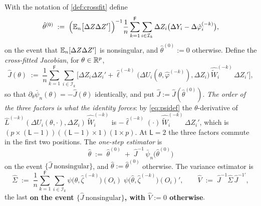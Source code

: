 \begin{definition}\label{def:onestep}
With the notation of \cref{def:crossfit} define
\begin{equation}\label{eq:prelimtheta}
\hat\theta^{(0)}\;:=\;\Big(\mathbb{E}_n\big[\Delta Z\Delta Z'\big]\Big)^{-1}
\frac1n\sum_{k=1}^{\mathsf F}\sum_{i\in\mathcal I_k}\Delta Z_i\big(\Delta Y_i-\Delta\hat\varphi^{(-k)}_i\big),
\end{equation}
on the event that $\mathbb{E}_n[\Delta Z\Delta Z']$ is nonsingular, and $\hat\theta^{(0)}:=0$ otherwise. Define
the \emph{cross-fitted Jacobian}, for $\theta\in\mathbb{R}^{p}$,
\begin{equation}\label{eq:Jhat}
\hat J(\theta)\;:=\;\frac1n\sum_{k=1}^{\mathsf F}\sum_{i\in\mathcal I_k}
\Big[\Delta Z_i\Delta Z_i'+
\hat\ell^{(-k)}\big(\Delta U_i(\theta,\hat\varphi^{(-k)}),\Delta Z_i\big)\,
\widehat{\widetilde W}^{(-k)}_i\,\Delta Z_i'\Big],
\end{equation}
so that $\partial_\theta\bar\psi_n(\theta)=-\hat J(\theta)$ identically, and put
$\hat J:=\hat J(\hat\theta^{(0)})$. \emph{The order of the three factors is what the identity forces}: by
\eqref{eq:psidef} the $\theta$-derivative of $\hat L^{(-k)}(\Delta U_i(\theta,\cdot),\Delta Z_i)\,
\widehat{\widetilde W}^{(-k)}_i$ is $-\hat\ell^{(-k)}(\cdot)\,\widehat{\widetilde W}^{(-k)}_i\,\Delta Z_i'$,
which is $(p\times(\mathsf L-1))((\mathsf L-1)\times1)(1\times p)$. At $\mathsf L=2$ the three factors
commute in the first two positions.
The \emph{one-step estimator} is
\begin{equation}\label{eq:onestep}
\hat\theta\;:=\;\hat\theta^{(0)}\;+\;\hat J^{-1}\,\bar\psi_n\big(\hat\theta^{(0)}\big)
\end{equation}
on the event $\{\hat J\ \text{nonsingular}\}$, and $\hat\theta:=\hat\theta^{(0)}$ otherwise. The variance
estimator is
\begin{equation}\label{eq:Sighat}
\hat\Sigma\;:=\;\frac1n\sum_{k=1}^{\mathsf F}\sum_{i\in\mathcal I_k}
\psi\big(\hat\theta,\hat\zeta^{(-k)}\big)(O_i)\;\psi\big(\hat\theta,\hat\zeta^{(-k)}\big)(O_i)' ,
\qquad
\hat V\;:=\;\hat J^{-1}\hat\Sigma\,\hat J^{-1\prime} ,
\end{equation}
the last \textbf{on the event $\{\hat J\ \text{nonsingular}\}$, with $\hat V:=0$ otherwise}.

\end{definition}
